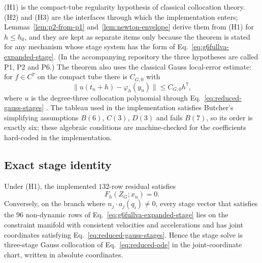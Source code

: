 (H1) is the compact-tube regularity hypothesis of classical collocation theory. (H2) and (H3) are
the interfaces through which the implementation enters; Lemmas~\ref{lem:p2-from-p1}
and~\ref{lem:newton-envelope} derive them from (H1) for $h\le h_0$, and they are kept as separate
items only because the theorem is stated for any mechanism whose stage system has the form of
Eq.~\eqref{eq:g6fullva-expanded-stage}. (In the accompanying repository the three hypotheses are
called P1, P2 and P6.) The theorem also uses the classical Gauss local-error estimate: for
$f\in C^7$ on the compact tube there is $C_{G,0}$ with
\begin{equation}
  \|u(t_n+h)-\varphi_h(y_n)\|\le C_{G,0}h^7,
  \label{eq:gauss-local-truncation}
\end{equation}
where $u$ is the degree-three collocation polynomial through Eq.~\eqref{eq:reduced-gauss-stages}
\cite{hairer1993solving}. The tableau used in the implementation satisfies Butcher's simplifying
assumptions $B(6)$, $C(3)$, $D(3)$ and fails $B(7)$, so its order is exactly six; these algebraic
conditions are machine-checked for the coefficients hard-coded in the implementation.

\subsection{Exact stage identity}

\begin{lemma}
\label{lem:exact-stage-identity}
Under (H1), the implemented $132$-row residual satisfies
\begin{equation}
  F_h(Z_G;x_n)=0 .
  \label{eq:exact-stage-identity}
\end{equation}
Conversely, on the branch where $n_j\cdot a_j(q_i)\neq0$, every stage vector that satisfies the
$96$ non-dynamic rows of Eq.~\eqref{eq:g6fullva-expanded-stage} lies on the constraint manifold
with consistent velocities and accelerations and has joint coordinates satisfying
Eq.~\eqref{eq:reduced-gauss-stages}. Hence the stage solve is three-stage Gauss collocation of
Eq.~\eqref{eq:reduced-ode} in the joint-coordinate chart, written in absolute coordinates.
\end{lemma}

